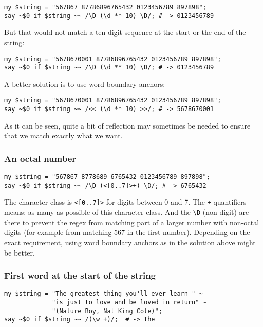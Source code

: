 \begin{verbatim}
my $string = "567867 87786896765432 0123456789 897898";
say ~$0 if $string ~~ /\D (\d ** 10) \D/; # -> 0123456789
\end{verbatim}

But that would not match a ten-digit sequence at the start 
or the end of the string:

\begin{verbatim}
my $string = "5678670001 87786896765432 0123456789 897898";
say ~$0 if $string ~~ /\D (\d ** 10) \D/; # -> 0123456789
\end{verbatim}

A better solution is to use word boundary anchors:

\begin{verbatim}
my $string = "5678670001 87786896765432 0123456789 897898";
say ~$0 if $string ~~ /<< (\d ** 10) >>/; # -> 5678670001
\end{verbatim}

As it can be seen, quite a bit of reflection may 
sometimes be needed to ensure that we match exactly 
what we want. 

\subsubsection{An octal number}

\begin{verbatim}
my $string = "567867 8778689 6765432 0123456789 897898";
say ~$0 if $string ~~ /\D (<[0..7]>+) \D/; # -> 6765432
\end{verbatim}

The character class is \verb'<[0..7]>' for digits between 
0 and 7. The \verb'+' quantifiers means: as many as possible 
of this character class. And the \verb'\D' (non digit) are 
there to prevent the regex from matching part of a larger 
number with non-octal digits (for example from matching 567 
in the first number). Depending on the exact requirement, 
using word boundary anchors as in the solution above might 
be better.

\subsubsection{First word at the start of the string}

\begin{verbatim}
my $string = "The greatest thing you'll ever learn " ~
             "is just to love and be loved in return" ~
             "(Nature Boy, Nat King Cole)";
say ~$0 if $string ~~ /(\w +)/;  # -> The
\end{verbatim}


